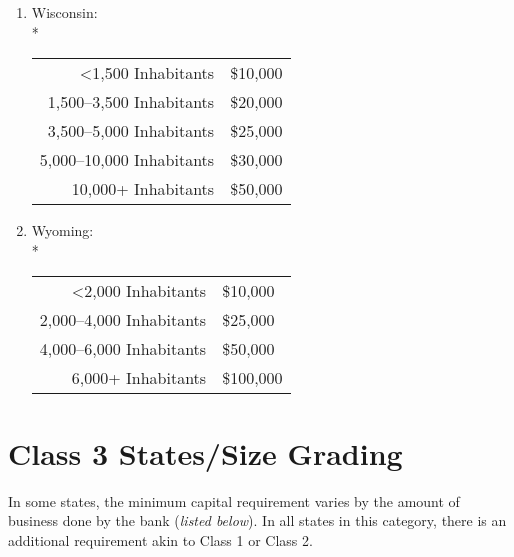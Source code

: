 ﻿\documentclass[12pt]{report}
\begin{document}
\begin{enumerate}
\begin{tabular}{r|l}
            \end{tabular}
        \item Wisconsin:\\*
            \begin{tabular}{r|l}
                <1,500 Inhabitants & \$10,000\\
                1,500--3,500 Inhabitants & \$20,000\\
                3,500--5,000 Inhabitants & \$25,000\\
                5,000--10,000 Inhabitants & \$30,000\\
                10,000+ Inhabitants & \$50,000
            \end{tabular}
        \item Wyoming:\\*
            \begin{tabular}{r|l}
                <2,000 Inhabitants & \$10,000\\
                2,000--4,000 Inhabitants & \$25,000\\
                4,000--6,000 Inhabitants & \$50,000\\
                6,000+ Inhabitants & \$100,000
            \end{tabular}
    \end{enumerate}

\section{Class 3 States/Size Grading}
In some states, the minimum capital requirement varies by the amount of business done by the bank (\textit{listed below}). In all states in this category, there is an additional requirement akin to Class 1 or Class 2.
\end{document}
